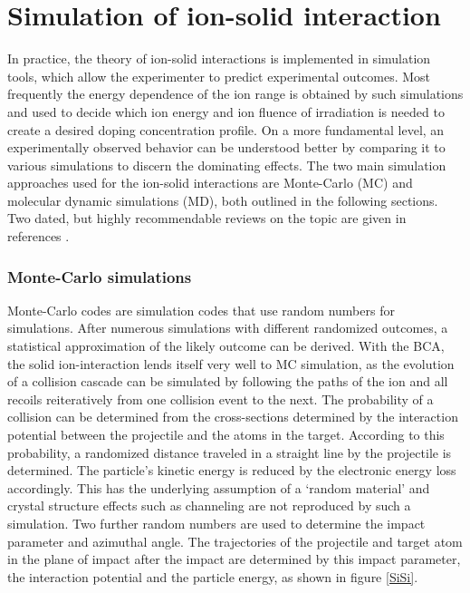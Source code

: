 \section{Simulation of ion-solid interaction}
\label{sec:simion}

In practice, the theory of ion-solid interactions is implemented in simulation tools, which allow the experimenter to predict experimental outcomes. Most frequently the energy dependence of the ion range is obtained by such simulations and used to decide which ion energy and ion fluence of irradiation is needed to create a desired doping concentration profile. On a more fundamental level, an experimentally observed behavior can be understood better by comparing it to various simulations to discern the dominating effects. The two main simulation approaches used for the ion-solid interactions are Monte-Carlo (MC) and molecular dynamic simulations (MD), both outlined in the following sections. Two dated, but highly recommendable reviews on the topic are given in references \cite{andersen_computer_1986,eckstein_computer_1991}.

\subsubsection{Monte-Carlo simulations}

Monte-Carlo codes are simulation codes that use random numbers for simulations. After numerous simulations with different randomized outcomes, a statistical approximation of the likely outcome can be derived. With the BCA, the solid ion-interaction lends itself very well to MC simulation, as the evolution of a collision cascade can be simulated by following the paths of the ion and all recoils reiteratively from one collision event to the next. The probability of a collision can be determined from the cross-sections determined by the interaction potential between the projectile and the atoms in the target. According to this probability, a randomized distance traveled in a straight line by the projectile is determined. The particle's kinetic energy is reduced by the electronic energy loss accordingly. This has the underlying assumption of a `random material' and crystal structure effects such as channeling are not reproduced by such a simulation. Two further random numbers are used to determine the impact parameter and azimuthal angle. The trajectories of the projectile and target atom in the plane of impact after the impact are determined by this impact parameter, the interaction potential and the particle energy, as shown in figure \ref{SiSi}.

